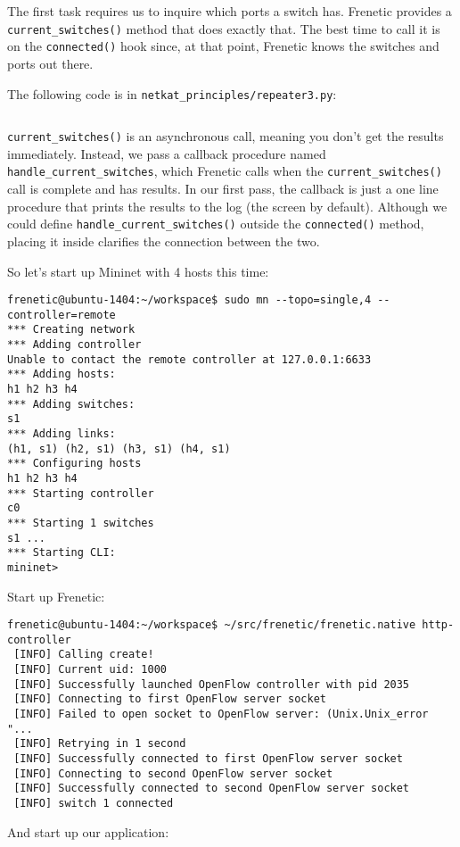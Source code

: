 The first task requires us to inquire which ports a switch has.  Frenetic provides a \texttt{current\_switches()}
method that does exactly that.   The best time to call it is on the \texttt{connected()} hook since, at that
point, Frenetic knows the switches and ports out there.

The following code is in \texttt{netkat\_principles/repeater3.py}:

\inputminted{python}{code/netkat_principles/repeater3.py}

\texttt{current\_switches()} is an asynchronous call, meaning you don't get the results immediately.
Instead, we pass a callback procedure named \texttt{handle\_current\_switches}, which Frenetic calls
when the \texttt{current\_switches()} call is complete and has results.  In our first pass, the callback
is just a one line procedure that prints the results to the log (the screen by default).  Although
we could define \texttt{handle\_current\_switches()} outside the \texttt{connected()} method, placing
it inside clarifies the connection between the two.  

So let's start up Mininet with 4 hosts this time:

\begin{verbatim}
frenetic@ubuntu-1404:~/workspace$ sudo mn --topo=single,4 --controller=remote
*** Creating network
*** Adding controller
Unable to contact the remote controller at 127.0.0.1:6633
*** Adding hosts:
h1 h2 h3 h4
*** Adding switches:
s1
*** Adding links:
(h1, s1) (h2, s1) (h3, s1) (h4, s1)
*** Configuring hosts
h1 h2 h3 h4
*** Starting controller
c0
*** Starting 1 switches
s1 ...
*** Starting CLI:
mininet>
\end{verbatim}

Start up Frenetic:

\begin{verbatim}
frenetic@ubuntu-1404:~/workspace$ ~/src/frenetic/frenetic.native http-controller
 [INFO] Calling create!
 [INFO] Current uid: 1000
 [INFO] Successfully launched OpenFlow controller with pid 2035
 [INFO] Connecting to first OpenFlow server socket
 [INFO] Failed to open socket to OpenFlow server: (Unix.Unix_error "...
 [INFO] Retrying in 1 second
 [INFO] Successfully connected to first OpenFlow server socket
 [INFO] Connecting to second OpenFlow server socket
 [INFO] Successfully connected to second OpenFlow server socket
 [INFO] switch 1 connected
\end{verbatim}

And start up our application:


